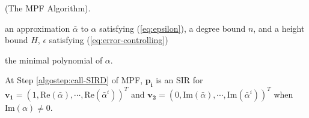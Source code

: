 \documentclass{sig-alternate}
\numberwithin{theorem}{section} \numberwithin{equation}{section}
\begin{document}
\begin{algorithm}[H]
\caption{(The MPF Algorithm).}
\begin{algorithmic}[1]
\REQUIRE an approximation $\bar{\alpha}$ to $\alpha$ satisfying
(\ref{eq:epsilon}), a degree bound $n$, and a height bound $H$,
$\epsilon$ satisfying (\ref{eq:error-controlling})



\ENSURE the minimal polynomial of $\alpha$.

\label{algostep: circulating}




\label{algostep:call-SIRD}













\label{algostep:if height(p)>H}















\ENDWHILE
\end{algorithmic}\label{algo:minimal-polynomial}
\end{algorithm}

\begin{rem}
At Step \ref{algostep:call-SIRD} of MPF, $\mathbf{p_i}$ is an SIR
for $\mathbf{v_1} = (1, \mbox{Re}(\bar{\alpha}), \cdots,
\mbox{Re}(\bar{\alpha}^i))^T$ and $\mathbf{v_2} = (0,
\mbox{Im}(\bar{\alpha}), \cdots, \mbox{Im}(\bar{\alpha}^i))^T$ when
 $\mbox{Im}(\alpha)\neq 0$.
\end{rem}
\end{document}
